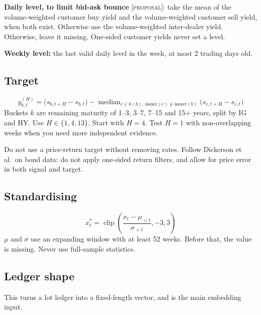 \documentclass[11pt]{article}
\newcommand{\proposal}{\textsc{[proposal]}}
\begin{document}
\textbf{Daily level, to limit bid-ask bounce} \proposal{}: take the mean of the volume-weighted customer buy yield and the volume-weighted customer sell yield, when both exist. Otherwise use the volume-weighted inter-dealer yield. Otherwise, leave it missing. One-sided customer yields never set a level.

\textbf{Weekly level:} the last valid daily level in the week, at most 2 trading days old.

\subsection{Target}
\[
y^{(H)}_{b,t} = \big(s_{b,t+H} - s_{b,t}\big) - \operatorname{median}_{c \in k(b),\, \mathrm{issuer}(c) \ne \mathrm{issuer}(b)} \big(s_{c,t+H} - s_{c,t}\big)
\]
Buckets $k$ are remaining maturity of 1--3, 3--7, 7--15 and 15+ years, split by IG and HY. Use $H \in \{1, 4, 13\}$. Start with $H = 4$. Test $H=1$ with non-overlapping weeks when you need more independent evidence.

Do not use a price-return target without removing rates. Follow Dickerson et al.\ on bond data: do not apply one-sided return filters, and allow for price error in both signal and target.

\subsection{Standardising}
\[
x^{\ast}_{t} = \operatorname{clip}\left(\frac{x_t - \mu_{<t}}{\sigma_{<t}}, -3, 3\right)
\]
$\mu$ and $\sigma$ use an expanding window with at least 52 weeks. Before that, the value is missing. Never use full-sample statistics.

\subsection{Ledger shape}\label{sec:shape}
This turns a lot ledger into a fixed-length vector, and is the main embedding input.
\end{document}
